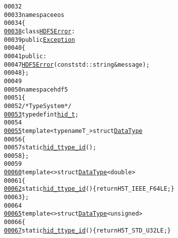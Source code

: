 \begin{footnotesize}
\begin{alltt}
00032 
00033 \textcolor{keyword}{namespace }eos
00034 \{
\hypertarget{hdf5_8hh_source_l00038}{}\hyperlink{classeos_1_1HDF5Error}{00038}     \textcolor{keyword}{class }\hyperlink{classeos_1_1HDF5Error}{HDF5Error} :
00039         \textcolor{keyword}{public} \hyperlink{classeos_1_1Exception}{Exception}
00040     \{
00041         \textcolor{keyword}{public}:
00047             \hyperlink{classeos_1_1HDF5Error_af32e08e06b9bedbe31e760574b1d6f7a}{HDF5Error}(\textcolor{keyword}{const} std::string & message);
00048     \};
00049 
00050     \textcolor{keyword}{namespace }hdf5
00051     \{
00052         \textcolor{comment}{/* Type System */}
\hypertarget{hdf5_8hh_source_l00053}{}\hyperlink{namespaceeos_1_1hdf5_a5bd5e209f1bf36cdc5551465dacf2e74}{00053}         \textcolor{keyword}{typedef} \textcolor{keywordtype}{int} \hyperlink{namespaceeos_1_1hdf5_a5bd5e209f1bf36cdc5551465dacf2e74}{hid_t};
00054 
\hypertarget{hdf5_8hh_source_l00055}{}\hyperlink{structeos_1_1hdf5_1_1DataType}{00055}         \textcolor{keyword}{template} <\textcolor{keyword}{typename} T\_> \textcolor{keyword}{struct }\hyperlink{structeos_1_1hdf5_1_1DataType}{DataType}
00056         \{
00057             \textcolor{keyword}{static} \hyperlink{namespaceeos_1_1hdf5_a5bd5e209f1bf36cdc5551465dacf2e74}{hid_t} \hyperlink{structeos_1_1hdf5_1_1DataType_a96dea8ef1e40e5af0c68658d9155bd44}{type_id}();
00058         \};
00059 
\hypertarget{hdf5_8hh_source_l00060}{}\hyperlink{structeos_1_1hdf5_1_1DataType_3_01double_01_4}{00060}         \textcolor{keyword}{template} <> \textcolor{keyword}{struct }\hyperlink{structeos_1_1hdf5_1_1DataType}{DataType}<double>
00061         \{
\hypertarget{hdf5_8hh_source_l00062}{}\hyperlink{structeos_1_1hdf5_1_1DataType_3_01double_01_4_a75d1dd38c44178ee0b761a234a20548d}{00062}             \textcolor{keyword}{static} \hyperlink{namespaceeos_1_1hdf5_a5bd5e209f1bf36cdc5551465dacf2e74}{hid_t} \hyperlink{structeos_1_1hdf5_1_1DataType_3_01double_01_4_a75d1dd38c44178ee0b761a234a20548d}{type_id}() \{ \textcolor{keywordflow}{return} H5T\_IEEE\_F64LE; \}
00063         \};
00064 
\hypertarget{hdf5_8hh_source_l00065}{}\hyperlink{structeos_1_1hdf5_1_1DataType_3_01unsigned_01_4}{00065}         \textcolor{keyword}{template} <> \textcolor{keyword}{struct }\hyperlink{structeos_1_1hdf5_1_1DataType}{DataType}<unsigned>
00066         \{
\hypertarget{hdf5_8hh_source_l00067}{}\hyperlink{structeos_1_1hdf5_1_1DataType_3_01unsigned_01_4_a8bc8ca9f5f6ba523da948d0babc6168c}{00067}             \textcolor{keyword}{static} \hyperlink{namespaceeos_1_1hdf5_a5bd5e209f1bf36cdc5551465dacf2e74}{hid_t} \hyperlink{structeos_1_1hdf5_1_1DataType_3_01unsigned_01_4_a8bc8ca9f5f6ba523da948d0babc6168c}{type_id}() \{ \textcolor{keywordflow}{return} H5T\_STD\_U32LE; \}

\end{alltt}
\end{footnotesize}

